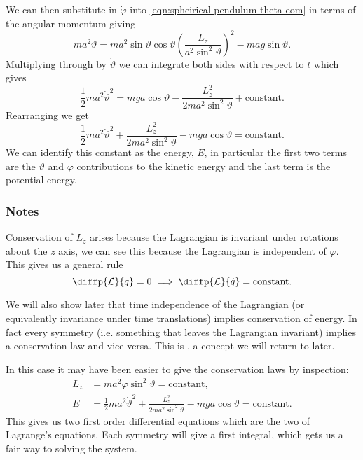 \documentclass[fleqn]{NotesClass}
\newcommand*{\lagrangian}{\mathcal{L}}
\begin{document}
    We can then substitute in \(\dot{\varphi}\) into \cref{eqn:spheirical pendulum theta eom} in terms of the angular momentum giving
    \begin{equation}
        ma^2\ddot{\vartheta} = ma^2\sin\vartheta\cos\vartheta \left( \frac{L_z}{a^2\sin^2\vartheta} \right)^2 - mag\sin\vartheta.
    \end{equation}
    Multiplying through by \(\dot{\vartheta}\) we can integrate both sides with respect to \(t\) which gives
    \begin{equation}
        \frac{1}{2}ma^2\dot{\vartheta}^2 = mga\cos\vartheta - \frac{L_z^2}{2ma^2\sin^2\vartheta} + \text{constant}.
    \end{equation}
    Rearranging we get
    \begin{equation}
        \frac{1}{2}ma^2\dot{\vartheta}^2 + \frac{L_z^2}{2ma^2\sin^2\vartheta} - mga\cos\vartheta = \text{constant}.
    \end{equation}
    We can identify this constant as the energy, \(E\), in particular the first two terms are the \(\vartheta\) and \(\varphi\) contributions to the kinetic energy and the last term is the potential energy.
    
    \subsubsection{Notes}
    Conservation of \(L_z\) arises because the Lagrangian is invariant under rotations about the \(z\) axis, we can see this because the Lagrangian is independent of \(\varphi\).
    This gives us a general rule
    \begin{equation}
        \diffp{\lagrangian}{q} = 0 \implies \diffp{\lagrangian}{\dot{q}} = \text{constant}.
    \end{equation}

    We will also show later that time independence of the Lagrangian (or equivalently invariance under time translations) implies conservation of energy.
    In fact every symmetry (i.e. something that leaves the Lagrangian invariant) implies a conservation law and vice versa.
    This is , a concept we will return to later.
    
    In this case it may have been easier to give the conservation laws by inspection:
    \begin{align}
        L_z &= ma^2 \dot{\varphi} \sin^2\vartheta = \text{constant},\\
        E &= \frac{1}{2}ma^2\dot{\vartheta}^2 + \frac{L_z^2}{2ma^2\sin^2\vartheta} - mga\cos\vartheta = \text{constant}.
    \end{align}
    This gives us two first order differential equations which are the two  of Lagrange's equations.
    Each symmetry will give a first integral, which gets us a fair way to solving the system.
    
\end{document}
